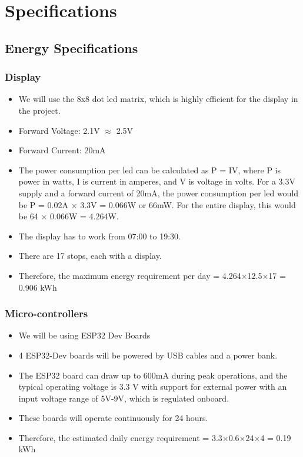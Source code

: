 \documentclass[12pt]{article} %
\begin{document}
\clearpage

\section{Specifications}
\subsection{Energy Specifications}
\subsubsection{Display}
\begin{itemize}
    \item We will use the 8x8 dot \acrshort{led} matrix, which is highly efficient for the display in the project.
    \item Forward Voltage: 2.1V $\approx$ 2.5V
    \item Forward Current: 20mA
    \item The power consumption per \acrshort{led} can be calculated as P = IV, where P is power in watts, I is current in amperes, and V is voltage in volts. For a 3.3V supply and a forward current of 20mA, the power consumption per \acrshort{led} would be P = 0.02A $\times$ 3.3V = 0.066W or 66mW. For the entire display, this would be 64 $\times$ 0.066W = 4.264W.
    \item The display has to work from 07:00 to 19:30.
    \item There are 17 stops, each with a display.
    \item Therefore, the maximum energy requirement per day = 4.264$\times$12.5$\times$17 = 0.906 kWh

\end{itemize}

\subsubsection{Micro-controllers}
\begin{itemize}
    \item We will be using ESP32  Dev Boards
    \item 4 ESP32-Dev boards will be powered by USB cables and a power bank.
    \item The ESP32 board can draw up to 600mA during peak operations, and the typical operating voltage is 3.3 V with support for external power with an input voltage range of 5V-9V, which is regulated onboard.
    \item These boards will operate continuously for 24 hours.
    \item Therefore, the estimated daily energy requirement = 3.3$\times$0.6$\times$24$\times$4 = 0.19 kWh

\end{itemize}
\end{document}

